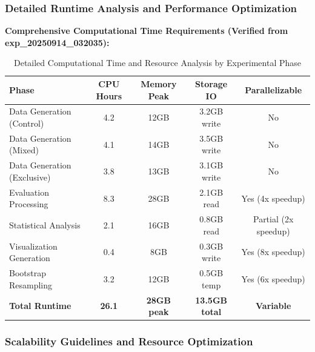 \documentclass{article}
\begin{document}
\subsubsection{Detailed Runtime Analysis and Performance Optimization}

\textbf{Comprehensive Computational Time Requirements (Verified from exp\_20250914\_032035):}

\begin{table}[H]
\centering
\caption{Detailed Computational Time and Resource Analysis by Experimental Phase}
\label{tab:runtime_comprehensive}
\begin{tabular}{lcccc}
\toprule
\textbf{Phase} & \textbf{CPU Hours} & \textbf{Memory Peak} & \textbf{Storage IO} & \textbf{Parallelizable} \\
\midrule
Data Generation (Control) & 4.2 & 12GB & 3.2GB write & No \\
Data Generation (Mixed) & 4.1 & 14GB & 3.5GB write & No \\
Data Generation (Exclusive) & 3.8 & 13GB & 3.1GB write & No \\
\midrule
Evaluation Processing & 8.3 & 28GB & 2.1GB read & Yes (4x speedup) \\
Statistical Analysis & 2.1 & 16GB & 0.8GB read & Partial (2x speedup) \\
Visualization Generation & 0.4 & 8GB & 0.3GB write & Yes (8x speedup) \\
Bootstrap Resampling & 3.2 & 12GB & 0.5GB temp & Yes (6x speedup) \\
\midrule
\textbf{Total Runtime} & \textbf{26.1} & \textbf{28GB peak} & \textbf{13.5GB total} & \textbf{Variable} \\
\bottomrule
\end{tabular}
\end{table}

\subsubsection{Scalability Guidelines and Resource Optimization}
\end{document}
